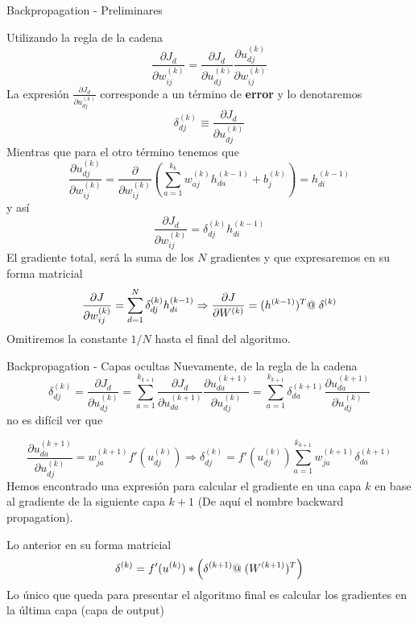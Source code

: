 \documentclass[handout, 9pt]{beamer}
\begin{document}
\begin{frame}{Backpropagation - Preliminares}

Utilizando la regla de la cadena 
\[
\frac{\partial J_d}{\partial w_{ij}^{(k)}} = \frac{\partial J_d}{\partial u_{dj}^{(k)}}\frac{\partial u_{dj}^{(k)}}{\partial w_{ij}^{(k)}}
\] \pause
La expresión $\frac{\partial J_d}{\partial u_{dj}^{(k)}}$ corresponde a un término de \textbf{error} y lo denotaremos \
\[
\delta_{dj}^{(k)} \equiv \frac{\partial J_d}{\partial u_{dj}^{(k)}}
\] \pause
Mientras que para el otro término tenemos que 
\[
\frac{\partial u_{dj}^{(k)}}{\partial w_{ij}^{(k)}} = \frac{\partial}{\partial w_{ij}^{(k)}} \left ( \sum_{a = 1}^{k_k}w_{aj}^{(k)}h_{da}^{(k-1)} + b_j^{(k)} \right) = h_{di}^{(k-1)}
\] \pause
y así 
\[
\frac{\partial J_d}{\partial w_{ij}^{(k)}} = \delta_{dj}^{(k)}  h_{di}^{(k-1)}
\] \pause
El gradiente total, será la suma de los $N$ gradientes y que expresaremos en su forma matricial
\[\frac{\partial J}{\partial w_{ij}^{(k)}} = \sum_{d=1}^N \delta_{dj}^{(k)}  h_{di}^{(k-1)}  \Rightarrow  \frac{\partial J}{\partial W^{(k)}} = (h^{(k-1)})^T @ \hspace{0.1cm} \delta^{(k)}
\]
Omitiremos la constante $1/N$ hasta el final del algoritmo.
\end{frame}
\begin{frame}{Backpropagation - Capas ocultas}
Nuevamente, de la regla de la cadena \pause
\[
\delta_{dj}^{(k)} = \frac{\partial J_d}{\partial u_{dj}^{(k)}} = \sum_{a=1}^{k_{k+1}} \frac{\partial J_d}{\partial u_{da}^{(k+1)}} \frac{\partial u_{da}^{(k+1)}}{\partial u_{dj}^{(k)}} = \sum_{a=1}^{k_{k+1}} \delta_{da}^{(k+1)} \frac{\partial u_{da}^{(k+1)}}{\partial u_{dj}^{(k)}}
\] 
\pause 
no es difícil ver que

\[
\frac{\partial u_{da}^{(k+1)}}{\partial u_{dj}^{(k)}} = w_{ja}^{(k+1)}f'(u_{dj}^{(k)})  \Rightarrow  \delta_{dj}^{(k)} = f'(u_{dj}^{(k)})\sum_{a=1}^{k_{k+1}}w_{ja}^{(k+1)}\delta_{da}^{(k+1)}
\]
\pause
Hemos encontrado una expresión para calcular el gradiente en una capa $k$ en base al gradiente de la siguiente capa $k+1$ (De aquí el nombre backward propagation).
\newline \pause

Lo anterior en su forma matricial
\[
\delta^{(k)} = f'(u^{(k)}) * \left ( \delta^{(k+1)} @ \hspace{0.1cm} (W^{(k+1)})^T \right )
\] \pause
Lo único que queda para presentar el algoritmo final es calcular los gradientes en la última capa (capa de output)

\end{frame}
\end{document}
